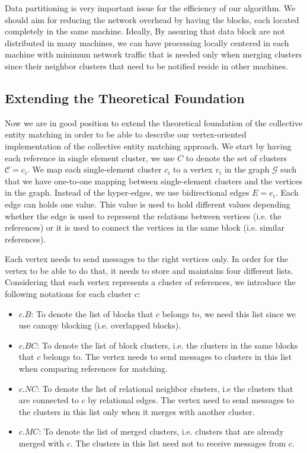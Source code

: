 Data partitioning is very important issue for the efficiency of our algorithm. We should aim for reducing the network overhead by having the blocks, each located completely in the same machine. Ideally, By assuring that data block are not distributed in many machines, we can have processing locally centered in each machine with minimum network traffic that is needed only when merging clusters since their neighbor clusters that need to be notified reside in other machines.

\subsection{Extending the Theoretical Foundation}

Now we are in good position to extend the theoretical foundation of the collective entity matching in order to be able to describe our vertex-oriented implementation of the collective entity matching approach. We start by having each reference in single element cluster, we use $C$ to denote the set of clusters $\mathcal{C}={c_i}$. We map each single-element cluster $c_i$ to a vertex $v_i$ in the graph $\mathcal{G}$ such that we have one-to-one mapping between single-element clusters and the vertices in the graph. Instead of the hyper-edges, we use bidirectional edges $E={e_i}$. Each edge can holds one value. This value is used to hold different values depending whether the edge is used to represent the relations between vertices (i.e. the references) or it is used to connect the vertices in the same block (i.e. similar references). 

Each vertex needs to send messages to the right vertices only. In order for the vertex to be able to do that, it needs to store and maintains four different lists. Considering that each vertex represents a cluster of references, we introduce the following notations for each cluster $c$:
\begin{itemize}
\item $c.B$: To denote the list of blocks that $c$ belongs to, we need this list since we use canopy blocking (i.e. overlapped blocks).
\item $c.BC$: To denote the list of block clusters, i.e. the clusters in the same blocks that $c$ belongs to. The vertex needs to send messages to clusters in this list when comparing references for matching.
\item $c.NC$: To denote the list of relational neighbor clusters, i.e the clusters that are connected to $c$ by relational edges. The vertex need to send messages to the clusters in this list only when it merges with another cluster. 
\item $c.MC$: To denote the list of merged clusters, i.e. clusters that are already merged with $c$. The clusters in this list need not to receive messages from $c$. 
\end{itemize}

